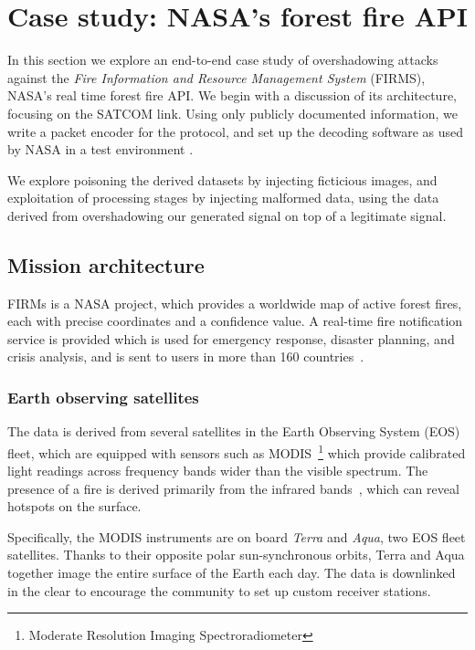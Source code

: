\section{Case study: NASA's forest fire API}\label{sec:attack}


In this section we explore an end-to-end case study of overshadowing attacks against the \textit{Fire Information and Resource Management System} (FIRMS), NASA's real time forest fire API.
We begin with a discussion of its architecture, focusing on the SATCOM link.
Using only publicly documented information, we write a packet encoder for the protocol, and set up the decoding software as used by NASA in a test environment .

We explore poisoning the derived datasets by injecting ficticious images, and exploitation of processing stages by injecting malformed data, using the data derived from overshadowing our generated signal on top of a legitimate signal.



\subsection{Mission architecture}

FIRMs is a NASA project, which provides a worldwide map of active forest fires, each with precise coordinates and a confidence value.
A real-time fire notification service is provided which is used for emergency response, disaster planning, and crisis analysis, and is sent to users in more than 160 countries~\cite{firmsUsage}.

\subsubsection{Earth observing satellites}

The data is derived from several satellites in the Earth Observing System (EOS) fleet, which are equipped with sensors such as MODIS~\footnote{Moderate Resolution Imaging Spectroradiometer} which provide calibrated light readings across frequency bands wider than the visible spectrum.
The presence of a fire is derived primarily from the infrared bands~\cite{mod14Manual}, which can reveal hotspots on the surface.

Specifically, the MODIS instruments are on board \textit{Terra} and \textit{Aqua}, two EOS fleet satellites.
Thanks to their opposite polar sun-synchronous orbits, Terra and Aqua together image the entire surface of the Earth each day.
The data is downlinked in the clear to encourage the community to set up custom receiver stations.

